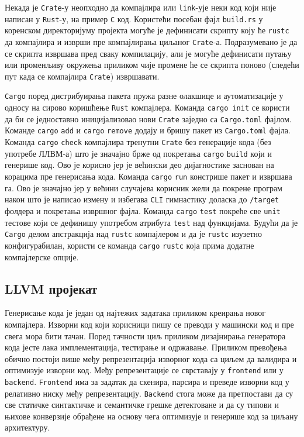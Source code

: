 Некада је \verb|Crate|-у неопходно да компајлира или \verb|link|-ује неки код који није написан у \verb|Rust|-у, на пример \verb|C| код. Користећи посебан фајл \verb|build.rs| у коренском директоријуму 
пројекта могуће је дефинисати скрипту коју ће \verb|rustc| да компајлира и изврши пре компајлирања циљаног \verb|Crate|-а. Подразумевано је да се скрипта извршава пред сваку компилацију,
али је могуће дефинисати путању или променљиву окружења приликом чије промене ће се скрипта поново (следећи пут када се компајлира \verb|Crate|) извршавати.

\verb|Cargo| поред дистрибуирања пакета пружа разне олакшице и аутоматизације у односу на сирово коришћење \verb|Rust| компајлера. 
Команда \verb|cargo init| се користи да би се једноставно иницијализовао нови \verb|Crate| заједно са \verb|Cargo.toml| фајлом. 
Команде \verb|cargo| \verb|add| и \verb|cargo| \verb|remove| додају и бришу пакет из \verb|Cargo.toml| фајла.
Команда \verb|cargo| \verb|check| компајлира тренутни \verb|Crate| без генерације кода (без употребе ЛЛВМ-а) што је значајно брже 
од покретања \verb|cargo| \verb|build| који и генерише код. Ово је корисно јер је већински део дијагностике заснован 
на корацима пре генерисања кода. Команда \verb|cargo| \verb|run| констрише пакет и извршава га. Ово је значајно јер у већини случајева корисник жели да покрене програм након што је 
написао измену и избегава \verb|CLI| гимнастику доласка до \verb|/target| фолдера и покретања извршног фајла. 
Команда \verb|cargo| \verb|test| покреће све \verb|unit| тестове који се дефинишу употребом атрибута \verb|test| над функцијама.
Будући да је \verb|Cargo| делом апстракција над \verb|rustc| компајлером и да је \verb|rustc| изузетно конфигурабилан, користи се команда \verb|cargo| \verb|rustc|
која прима додатне компајлерске опције.

\newpage

\subsection{LLVM пројекат}

Генерисање кода је један од најтежих задатака приликом креирања новог компајлера. Изворни код који 
корисници пишу се преводи у машински код и пре свега мора бити тачан. Поред тачности циљ приликом 
дизајнирања генератора кода јесте лака имплементација, тестирање и одржавање.
Приликом превођења обично постоји 
више међу репрезентација изворног кода са циљем да валидира и оптимизује изворни код. Међу репрезентације 
се сврставају у \verb|frontend| или у \verb|backend|. \verb|Frontend| има за задатак да скенира, парсира 
и преведе изворни код у релативно ниску међу репрезентацију. \verb|Backend| стога може да претпостави 
да су све статичке синтактичке и семантичке грешке детектоване и да су типови и њихове конверзије
обрађене на основу чега оптимизује и генерише код за циљану архитектуру.

